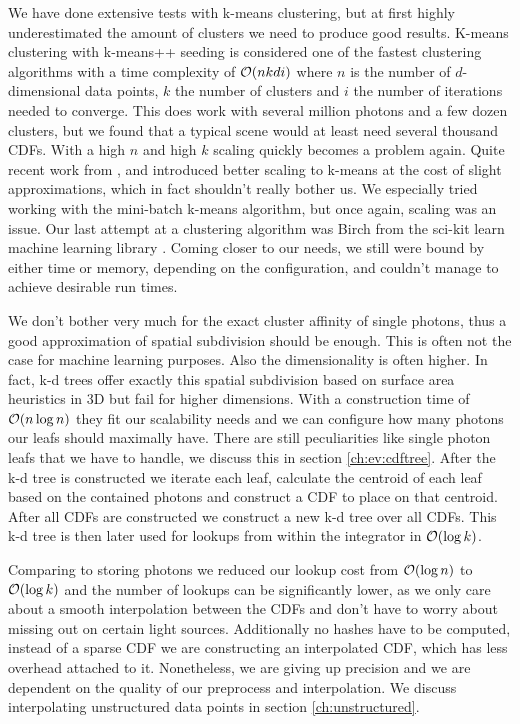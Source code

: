 We have done extensive tests with k-means clustering, but at first highly underestimated the amount of clusters we need to produce good results. K-means clustering with k-means++ seeding \cite{DBLP:conf/soda/ArthurV07} is considered one of the fastest clustering algorithms with a time complexity of $\mathcal{O}(nkdi)$ where $n$ is the number of $d$-dimensional data points, $k$ the number of clusters and $i$ the number of iterations needed to converge. This does work with several million photons and a few dozen clusters, but we found that a typical scene would at least need several thousand CDFs. With a high $n$ and high $k$ scaling quickly becomes a problem again. Quite recent work from \cite{DBLP:conf/kse/HieuM14}, \cite{DBLP:journals/tpds/XuQLMLL14} and \cite{DBLP:conf/www/Sculley10} introduced better scaling to k-means at the cost of slight approximations, which in fact shouldn't really bother us. We especially tried working with the mini-batch k-means algorithm, but once again, scaling was an issue. Our last attempt at a clustering algorithm was Birch \cite{DBLP:conf/sigmod/ZhangRL96} from the sci-kit learn machine learning library \cite{scikit-learn}. Coming closer to our needs, we still were bound by either time or memory, depending on the configuration, and couldn't manage to achieve desirable run times.

We don't bother very much for the exact cluster affinity of single photons, thus a good approximation of spatial subdivision should be enough. This is often not the case for machine learning purposes. Also the dimensionality is often higher. In fact, k-d trees offer exactly this spatial subdivision based on surface area heuristics in 3D but fail for higher dimensions. With a construction time of $\mathcal{O}(n \log n)$ they fit our scalability needs and we can configure how many photons our leafs should maximally have. There are still peculiarities like single photon leafs that we have to handle, we discuss this in section \ref{ch:ev:cdftree}. After the k-d tree is constructed we iterate each leaf, calculate the centroid of each leaf based on the contained photons and construct a CDF to place on that centroid. After all CDFs are constructed we construct a new k-d tree over all CDFs. This k-d tree is then later used for lookups from within the integrator in $\mathcal{O}(\log k)$.

Comparing to storing photons we reduced our lookup cost from $\mathcal{O}(\log n)$ to $\mathcal{O}(\log k)$ and the number of lookups can be significantly lower, as we only care about a smooth interpolation between the CDFs and don't have to worry about missing out on certain light sources. Additionally no hashes have to be computed, instead of a sparse CDF we are constructing an interpolated CDF, which has less overhead attached to it. Nonetheless, we are giving up precision and we are dependent on the quality of our preprocess and interpolation. We discuss interpolating unstructured data points in section \ref{ch:unstructured}.


